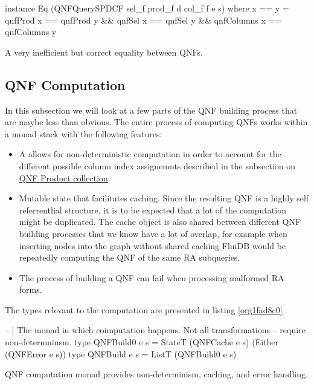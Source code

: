 \begin{code}
  \begin{haskellcode}
    instance Eq (QNFQuerySPDCF sel_f prod_f d col_f f e s) where
    x == y = qnfProd x == qnfProd y
    && qnfSel x == qnfSel y
    && qnfColumns x == qnfColumns y
  \end{haskellcode}
  \caption{\label{org4097f67}A very inefficient but correct equality between QNFs.}
\end{code}




\subsection{QNF Computation}
\label{sec:org3f1036f}
In this subsection we will look at a few parts of the QNF building
process that are maybe less than obvious. The entire process of
computing QNFs works within a monad stack with the following features:

\begin{itemize}
\item A  allows for non-deterministic computation in order to
  account for the different possible column index assignemnts
  described in the subsection on \hyperref[sec:org86e5e2d]{QNF Product collection}.
\item Mutable state that facilitates caching. Since the resulting QNF is a
  highly self referrentlial structure, it is to be expected that a lot
  of the computation might be duplicated. The cache object is also
  shared between different QNF building processes that we know have a
  lot of overlap, for example when inserting nodes into the graph
  without shared caching FluiDB would be repeatedly computing the QNF
  of the same RA subqueries.
\item The process of building a QNF can fail when processing malformed RA
  forms.
\end{itemize}

The types relevant to the computation are presented in listing
\ref{org1fad8c0}

\begin{code}
  \begin{haskellcode}
    -- | The monad in which coimputation happens. Not all transformations
    -- require non-determninsm.
    type QNFBuild0 e s = StateT (QNFCache e s) (Either (QNFError e s))
    type QNFBuild e s = ListT (QNFBuild0 e s)
  \end{haskellcode}
  \caption{\label{org1fad8c0}QNF computation monad provides non-determinism, caching, and error handling.}
\end{code}

